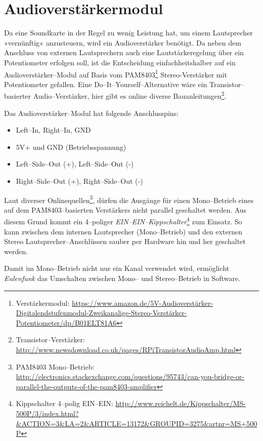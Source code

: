 \documentclass[11pt,ngerman,toc=listof,index=totoc]{scrreprt}
\providecommand{\tightlist}{%
  \setlength{\itemsep}{0pt}\setlength{\parskip}{0pt}}
\begin{document}
\section{Audioverstärkermodul}\label{audioverstuxe4rkermodul}

Da eine Soundkarte in der Regel zu wenig Leistung hat, um einem
Lautsprecher »vernünftig« anzusteuern, wird ein Audioverstärker
benötigt. Da neben dem Anschluss von externen Lautsprechern auch eine
Lautstärkeregelung über ein Potentiometer erfolgen soll, ist die
Entscheidung einfachheitshalber auf ein Audioverstärker--Modul auf Basis
vom PAM8403\footnote{Verstärkermodul:
  \url{https://www.amazon.de/5V-Audioverstärker-Digitalendstufenmodul-Zweikanalige-Stereo-Verstärker-Potentiometer/dp/B01ELT81A6}}
Stereo-Verstärker mit Potentiometer gefallen. Eine
Do--It--Yourself--Alternative wäre ein Transistor--basierter
Audio--Verstärker, hier gibt es online diverse Bauanleitungen\footnote{Transistor--Verstärker:
  \url{http://www.newsdownload.co.uk/pages/RPiTransistorAudioAmp.html}}.

Das Audioverstärker--Modul hat folgende Anschlusspins:

\begin{itemize}
\tightlist
\item
  Left--In, Right--In, GND
\item
  5V+ und GND (Betriebsspannung)
\item
  Left--Side--Out (+), Left--Side--Out (-)
\item
  Right--Side--Out (+), Right--Side--Out (-)
\end{itemize}

Laut diverser Onlinequellen\footnote{PAM8403 Mono--Betrieb:
  \url{http://electronics.stackexchange.com/questions/95743/can-you-bridge-or-parallel-the-outputs-of-the-pam8403-amplifier}},
dürfen die Ausgänge für einen Mono--Betrieb eines auf dem
PAM8403--basierten Verstärkers nicht parallel geschaltet werden. Aus
diesem Grund kommt ein 4--poliger
\emph{EIN--EIN--Kippschalter}\footnote{Kippschalter 4--polig EIN--EIN:
  \url{http://www.reichelt.de/Kippschalter/MS-500P/3/index.html?&ACTION=3&LA=2&ARTICLE=13172&GROUPID=3275&artnr=MS+500P}}
zum Einsatz. So kann zwischen dem internen Lautsprecher (Mono--Betrieb)
und den externen Stereo Lautsprecher--Anschlüssen sauber per Hardware
hin und her geschaltet werden.

Damit im Mono--Betrieb nicht nur ein Kanal verwendet wird, ermöglicht
\emph{Eulenfunk} das Umschalten zwischen Mono-- und Stereo--Betrieb in
Software.
\end{document}
